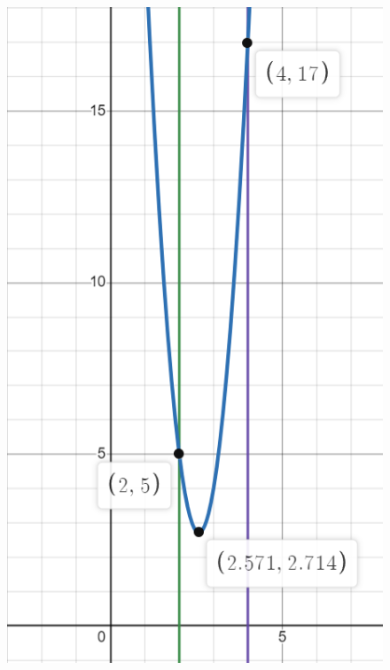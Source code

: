 \documentclass[12pt,a4paper]{ctexart}
\begin{document}
\begin{itemize}
\begin{figure}[!h]
{            \includegraphics[scale=0.5]{L(x,6).png}}
\end{figure}
\end{itemize}
\end{document}
